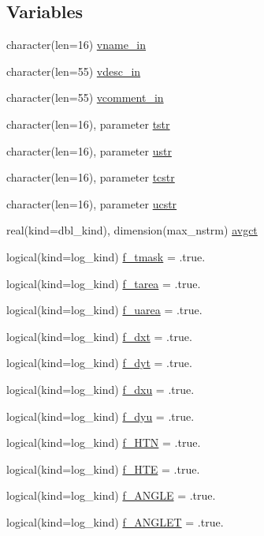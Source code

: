 \subsection*{Variables}
\begin{DoxyCompactItemize}
\item 
character(len=16) \hyperlink{namespaceice__history_a795d9a5379207bc00848c3d58be6fac2}{vname\_\-in}
\item 
character(len=55) \hyperlink{namespaceice__history_a000ee3af05f02fbff13085400a751e53}{vdesc\_\-in}
\item 
character(len=55) \hyperlink{namespaceice__history_ab6f7ee9f2623bb2e08b57018462544df}{vcomment\_\-in}
\item 
character(len=16), parameter \hyperlink{namespaceice__history_ab16190577859fe12663ca28b0690e5ec}{tstr}
\item 
character(len=16), parameter \hyperlink{namespaceice__history_a2b8d89b4e6bf73f99efde8b74906cef9}{ustr}
\item 
character(len=16), parameter \hyperlink{namespaceice__history_a56409d6f67844894d11f17ca553864bf}{tcstr}
\item 
character(len=16), parameter \hyperlink{namespaceice__history_a6d6a4603e818d63fe00df57441c0a5fb}{ucstr}
\item 
real(kind=dbl\_\-kind), dimension(max\_\-nstrm) \hyperlink{namespaceice__history_a8f63bda9e9e4d0a76e49e17002210ae4}{avgct}
\item 
logical(kind=log\_\-kind) \hyperlink{namespaceice__history_ac6635a8bcde54a554d4b60c7c6566b26}{f\_\-tmask} = .true.
\item 
logical(kind=log\_\-kind) \hyperlink{namespaceice__history_a7b8cc0a9e56bbe22f0015aa2062953d0}{f\_\-tarea} = .true.
\item 
logical(kind=log\_\-kind) \hyperlink{namespaceice__history_ac39fd46be06edb447fb96f16103e4d96}{f\_\-uarea} = .true.
\item 
logical(kind=log\_\-kind) \hyperlink{namespaceice__history_a6effc6ebe9b5dc7d958341622f11530c}{f\_\-dxt} = .true.
\item 
logical(kind=log\_\-kind) \hyperlink{namespaceice__history_a7976eedce7471cfcf14fe54b09e5e2a0}{f\_\-dyt} = .true.
\item 
logical(kind=log\_\-kind) \hyperlink{namespaceice__history_ac2cca9bb022f44a98a6cff9a59cd19e3}{f\_\-dxu} = .true.
\item 
logical(kind=log\_\-kind) \hyperlink{namespaceice__history_a5fe48a0bc8e7dcdbe8689feadd8cdd70}{f\_\-dyu} = .true.
\item 
logical(kind=log\_\-kind) \hyperlink{namespaceice__history_a7e63313bc71fed15ff1d16cbaf4d74ea}{f\_\-HTN} = .true.
\item 
logical(kind=log\_\-kind) \hyperlink{namespaceice__history_ac61273f25f1bb3b60c8cc5c55c8fd490}{f\_\-HTE} = .true.
\item 
logical(kind=log\_\-kind) \hyperlink{namespaceice__history_ae355872badcbed142dd282929330dae7}{f\_\-ANGLE} = .true.
\item 
logical(kind=log\_\-kind) \hyperlink{namespaceice__history_a31c241b97efeccd9b191577aa4bf3b4a}{f\_\-ANGLET} = .true.
\end{DoxyCompactItemize}


